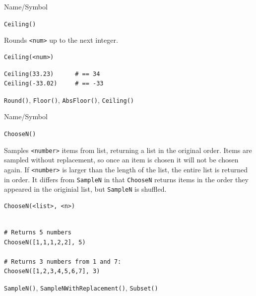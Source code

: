 \vfill
\newpage
{}
\vfill

\begin{desc}{Name/Symbol}
\item[Name/Symbol]  	\verb+Ceiling()+

\item[Description] 	Rounds \verb+<num>+ up to the next integer.

\item[Usage]
\begin{verbatim}
Ceiling(<num>)
\end{verbatim}

\item[Example] 
\begin{verbatim}
Ceiling(33.23)  	# == 34
Ceiling(-33.02) 	# == -33
\end{verbatim}

\item[See Also]     	\verb+Round()+, \verb+Floor()+, \verb+AbsFloor()+, \verb+Ceiling()+
\end{desc}



\begin{desc}{Name/Symbol}
\item[Name/Symbol]  	\verb+ChooseN()+

\item[Description] Samples \verb+<number>+ items from list, returning
  a list in the original order. Items are sampled without replacement, so
  once an item is chosen it will not be chosen again. If
  \verb+<number>+ is larger than the length of the list, the entire
  list is returned in order.  It differs from \verb+SampleN+ in that
  \verb+ChooseN+ returns items in the order they appeared in the
  originial list, but \verb+SampleN+ is shuffled. 

\item[Usage]       	
\begin{verbatim}
ChooseN(<list>, <n>)
\end{verbatim}

\item[Example]   	
\begin{verbatim}

# Returns 5 numbers
ChooseN([1,1,1,2,2], 5)     

# Returns 3 numbers from 1 and 7:
ChooseN([1,2,3,4,5,6,7], 3) 

\end{verbatim}

\item[See Also]    	\verb+SampleN()+, \verb+SampleNWithReplacement()+, \verb+Subset()+
\end{desc}



